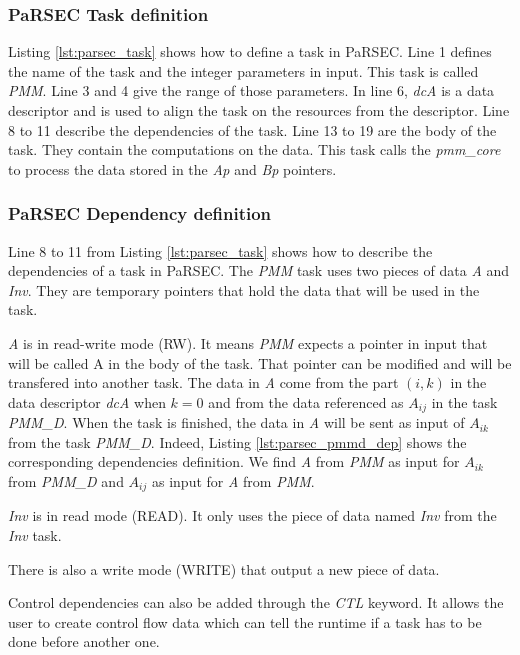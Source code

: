 \subsubsection{PaRSEC Task definition}
Listing \ref{lst:parsec_task} shows how to define a task in PaRSEC.
Line 1 defines the name of the task and the integer parameters in input.
This task is called \textit{PMM}.
Line 3 and 4 give the range of those parameters.
In line 6, \textit{dcA} is a data descriptor and is used to align the task on the resources from the descriptor.
Line 8 to 11 describe the dependencies of the task.
Line 13 to 19 are the body of the task.
They contain the computations on the data.
This task calls the \textit{pmm\_core} to process the data stored in the \textit{Ap} and \textit{Bp} pointers.


\subsubsection{PaRSEC Dependency definition}
Line 8 to 11 from Listing \ref{lst:parsec_task} shows how to describe the dependencies of a task in PaRSEC.
The \textit{PMM} task uses two pieces of data \textit{A} and \textit{Inv}.
They are temporary pointers that hold the data that will be used in the task.

\textit{A} is in read-write mode (RW).
It means \textit{PMM} expects a pointer in input that will be called A in the body of the task.
That pointer can be modified and will be transfered into another task.
The data in \textit{A} come from the part $(i,k)$ in the data descriptor \textit{dcA} when $k=0$ and from the data referenced as \textit{$A_{ij}$} in the task \textit{PMM\_D}.
When the task is finished, the data in \textit{A} will be sent as input of \textit{$A_{ik}$} from the task \textit{PMM\_D}.
Indeed, Listing \ref{lst:parsec_pmmd_dep} shows the corresponding dependencies definition.
We find \textit{A} from \textit{PMM} as input for \textit{$A_{ik}$} from \textit{PMM\_D} and \textit{$A_{ij}$} as input for \textit{A} from \textit{PMM}.

\textit{Inv} is in read mode (READ).
It only uses the piece of data named \textit{Inv} from the \textit{Inv} task.

There is also a write mode (WRITE) that output a new piece of data.

Control dependencies can also be added through the \textit{CTL} keyword.
It allows the user to create control flow data which can tell the runtime if a task has to be done before another one.

